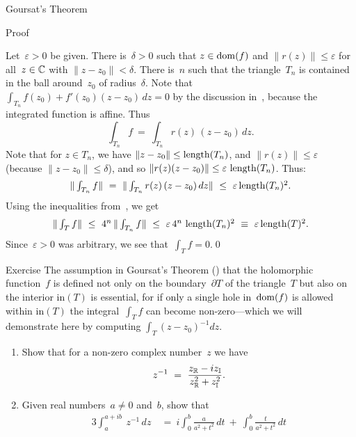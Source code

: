 \documentclass[a]{subfiles}
\begin{document}
\begin{parsec}
\begin{point}[goursat]{Goursat's Theorem}
\begin{point}[goursat-1]{Proof}
\begin{point}
Let~$\varepsilon >0$ be given.
There is~$\delta>0$
such that $z\in\operatorname{dom}(f)$
and $\|r(z)\|\leq \varepsilon$
for all~$z\in \mathbb{C}$ with $\|z-z_0\|<\delta$.
There is~$n$ such that the triangle~$T_n$ is contained
in the ball around~$z_0$ of radius~$\delta$.
Note that $\int_{T_n} f(z_0)+f'(z_0)(z-z_0)\,dz=0$
by the discussion in~, because
the integrated function is affine.
Thus
\begin{equation*}
\textstyle
\int_{T_n} f \  = \ \int_{T_n}r(z)\,(z-z_0)\,dz.
\end{equation*}
Note that for $z\in T_n$,
we have  $\|z-z_0\|\leq \operatorname{length}(T_n)$,
and $\|r(z)\|\leq \varepsilon$ (because $\|z-z_0\|\leq \delta$),
and so $\|r(z)(z-z_0)\|\leq \varepsilon\,\operatorname{length}(T_n)$.
Thus:
\begin{equation*}
\textstyle
\|\int_{T_n} f\| \  = \ \|\int_{T_n}r(z)\,(z-z_0)\,dz\|
\ \leq\ \varepsilon\operatorname{length}(T_n)^2.
\end{equation*}
Using the inequalities from~,
we get
\begin{equation*}
\textstyle
\|\int_T f\|\ \leq\ 4^n\, \|\int_{T_n} f\|
\ \leq\ \varepsilon \,4^n\,\operatorname{length}(T_n)^2 
\ \equiv\ \varepsilon \operatorname{length}(T)^2.
\end{equation*}
Since~$\varepsilon>0$ was arbitrary,
we see that~$\int_T f=0$.\qed
\end{point}
\end{point}
\end{point}%
\begin{point}[invint]{Exercise}%
	The assumption in Goursat's Theorem ()
that the holomorphic function~$f$
is defined not only on the boundary~$\partial T$
of the triangle~$T$
but also on the interior $\mathrm{in}(T)$
is essential,
for if only a single hole in~$\operatorname{dom}(f)$ is allowed within $\mathrm{in}(T)$
the integral~$\int_T f$ can become non-zero---which we will demonstrate
here by computing
$\int_T (z-z_0)^{-1}dz$.
\begin{enumerate}%
\item
Show that for a non-zero
complex number~$z$ we have
\begin{equation*}
	z^{-1}\ =\  \frac{\Real{z}-i\Imag{z}}{\Real{z}^2+\Imag{z}^2}.
\end{equation*}
\item
Given real numbers~$a\neq 0$ and~$b$,
show that
\begin{alignat*}{3}
	\int_{a}^{a+ib}\ 
	z^{-1}\,dz
	\ &=\ 
	i\int_0^b \frac{a}{a^2+t^2}\,dt 
	\ +\ 
	\int_0^b \frac{t}{a^2+t^2}\,dt\\

\end{alignat*}
\end{enumerate}
\end{point}
\end{parsec}
\end{document}
